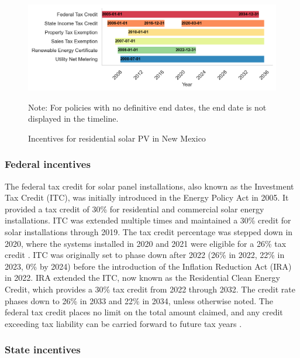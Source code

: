 \documentclass[11pt,twoside,letterpaper]{article}
\begin{document}
\begin{figure}[H]
    \centering
    \includegraphics[width=1\textwidth]{figures/policy_timeline.png}
    \caption{Incentives for residential solar PV in New Mexico}
    \label{fig:nm_incentive}
    \begin{flushleft}
        \footnotesize Note: For policies with no definitive end dates, the end date is not displayed in the timeline.
    \end{flushleft}
\end{figure}

\subsubsection{Federal incentives}


The federal tax credit for solar panel installations, also known as the Investment Tax Credit (ITC), was initially introduced in the Energy Policy Act in 2005. It provided a tax credit of 30\% for residential and commercial solar energy installations. ITC was extended multiple times and maintained a 30\% credit for solar installations through 2019. The tax credit percentage was stepped down in 2020, where the systems installed in 2020 and 2021 were eligible for a 26\% tax credit \parencite{doeitc}. ITC was originally set to phase down after 2022 (26\% in 2022, 22\% in 2023, 0\% by 2024) before the introduction of the Inflation Reduction Act (IRA) in 2022. IRA extended the ITC, now known as the Residential Clean Energy Credit, which provides a 30\% tax credit from 2022 through 2032. The credit rate phases down to 26\% in 2033 and 22\% in 2034, unless otherwise noted. The federal tax credit places no limit on the total amount claimed, and any credit exceeding tax liability can be carried forward to future tax years \parencite{irs}.

\subsubsection{State incentives}
\end{document}
